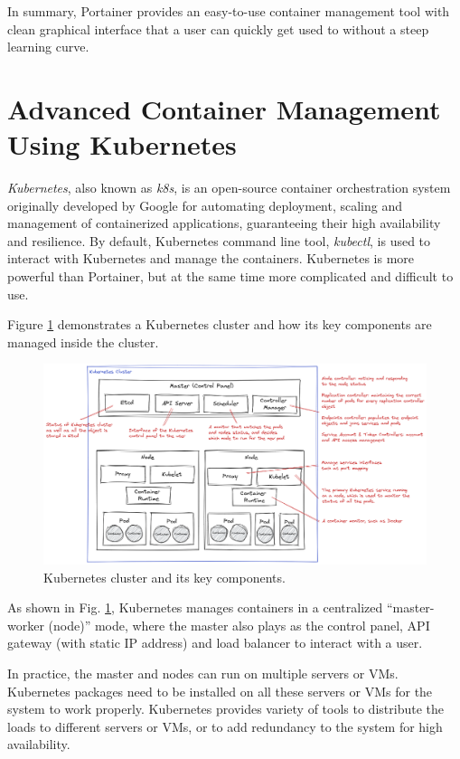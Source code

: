 In summary, Portainer provides an easy-to-use container management tool with clean graphical interface that a user can quickly get used to without a steep learning curve.

\section{Advanced Container Management Using Kubernetes}

\textit{Kubernetes}, also known as \textit{k8s}, is an open-source container orchestration system originally developed by Google for automating deployment, scaling and management of containerized applications, guaranteeing their high availability and resilience. By default, Kubernetes command line tool, \textit{kubectl}, is used to interact with Kubernetes and manage the containers. Kubernetes is more powerful than Portainer, but at the same time more complicated and difficult to use.

Figure \ref{ch:vac:fig:kubernetescluster} demonstrates a Kubernetes cluster and how its key components are managed inside the cluster.
\begin{figure}
	\centering
	\includegraphics[width=350pt]{chapters/ch-virtualization-and-containerization/figures/kubernetescluster.png}
	\caption{Kubernetes cluster and its key components.} \label{ch:vac:fig:kubernetescluster}
\end{figure}

As shown in Fig. \ref{ch:vac:fig:kubernetescluster}, Kubernetes manages containers in a centralized ``master-worker (node)'' mode, where the master also plays as the control panel, API gateway (with static IP address) and load balancer to interact with a user. 

In practice, the master and nodes can run on multiple servers or VMs. Kubernetes packages need to be installed on all these servers or VMs for the system to work properly. Kubernetes provides variety of tools to distribute the loads to different servers or VMs, or to add redundancy to the system for high availability. 

